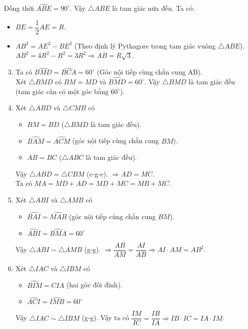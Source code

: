 \begin{bt}
{		\quad Đồng thời $\widehat{ABE}=90^\circ$. Vậy $\triangle ABE$ là tam giác nửa đều. Ta có:
		\begin{itemize}
			\item $BE=\dfrac{1}{2}AE=R$.
			\item $AB^2=AE^2-BE^2$ (Theo định lý Pythagore trong tam giác vuông $\triangle ABE$).\\
			$AB^2 = 4R^2-R^2=3R^2\Rightarrow AB=R\sqrt{3}$.
		\end{itemize}
		\begin{enumerate}
			\setcounter{enumi}{2}
			\item Ta có $\widehat{BMD}=\widehat{BCA}=60^\circ$ (Góc nội tiếp cùng chắn cung AB).\\
			Xét $\triangle BMD$ có $BM=MD$ và $\widehat{BMD}=60^\circ$. Vậy $\triangle BMD$ là tam giác đều (tam giác cân có một góc bẳng $60^\circ$).
			\item Xét $\triangle ABD$ và $\triangle CMB$ có
			\begin{itemize}
				\item $BM=BD$ ($\triangle BMD$ là tam giác đều).
				\item $\widehat{BAM}=\widehat{ACM}$ (góc nội tiếp cùng chắn cung $BM$).
				\item $AB=BC$ ($\triangle ABC$ là tam giác đều).
			\end{itemize}
			Vậy $\triangle ABD=\triangle CBM$ (c-g-c). $\Rightarrow AD=MC$.\\
			Ta có $MA=MD+AD=MD+MC=MB+MC$.
			\item Xét $\triangle ABI$ và $\triangle AMB$ có
			\begin{itemize}
				\item $\widehat{BAI}=\widehat{MAB}$ (góc nội tiếp cùng chắn cung $BM$).
				\item $\widehat{ABI}=\widehat{BMA}=60^\circ$
			\end{itemize}
			Vậy $\triangle ABI \sim \triangle AMB$ (g-g). $\Rightarrow \dfrac{AB}{AM}=\dfrac{AI}{AB}\Rightarrow AI\cdot AM=AB^2$.
			\item Xét $\triangle IAC$ và $\triangle IBM$ có 
			\begin{itemize}
				\item $\widehat{BIM}=\widehat{CIA}$ (hai góc đối đỉnh).
				\item $\widehat{ACI}=\widehat{IMB}=60^\circ$
			\end{itemize}
			Vậy $\triangle IAC \sim \triangle IBM$ (g-g). Vậy ta có $\dfrac{IM}{IC}=\dfrac{IB}{IA}\Rightarrow IB\cdot IC=IA\cdot IM$.

\end{enumerate}}
\end{bt}
